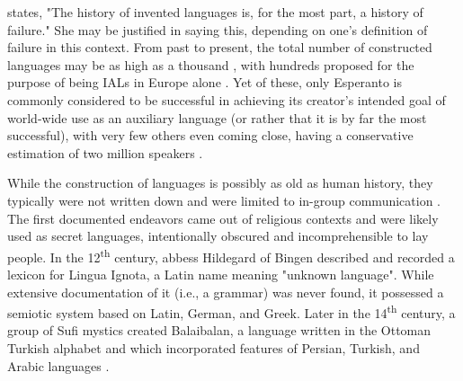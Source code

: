 \documentclass[12pt,a4paper]{article}
\numberwithin{figure}{section}
\numberwithin{table}{section}
\numberwithin{definition}{section}
\begin{document}

\textcite{okrent2009book} states, "The history of invented languages is, for the most part, a history of failure." She may be justified in saying this, depending on one's definition of failure in this context. From past to present, the total number of constructed languages may be as high as a thousand \parencite{Libert2016inbook,Schubert1989inbook}, with hundreds proposed for the purpose of being IALs in Europe alone \parencite{Schubert2001book}. Yet of these, only Esperanto is commonly considered to be successful in achieving its creator's intended goal of world-wide use as an auxiliary language (or rather that it is by far the most successful), with very few others even coming close, having a conservative estimation of two million speakers \parencite{okrent2009book}.

While the construction of languages is possibly as old as human history, they typically were not written down and were limited to in-group communication \parencite{Gobbo2016article}. The first documented endeavors came out of religious contexts and were likely used as secret languages, intentionally obscured and incomprehensible to lay people. In the 12\textsuperscript{th} century, abbess Hildegard of Bingen described and recorded a lexicon for Lingua Ignota, a Latin name meaning "unknown language". While extensive documentation of it (i.e., a grammar) was never found, it possessed a semiotic system based on Latin, German, and Greek. Later in the 14\textsuperscript{th} century, a group of Sufi mystics created Balaibalan, a language written in the Ottoman Turkish alphabet and which incorporated features of Persian, Turkish, and Arabic languages \parencite{Novikov2022article}.
\end{document}
